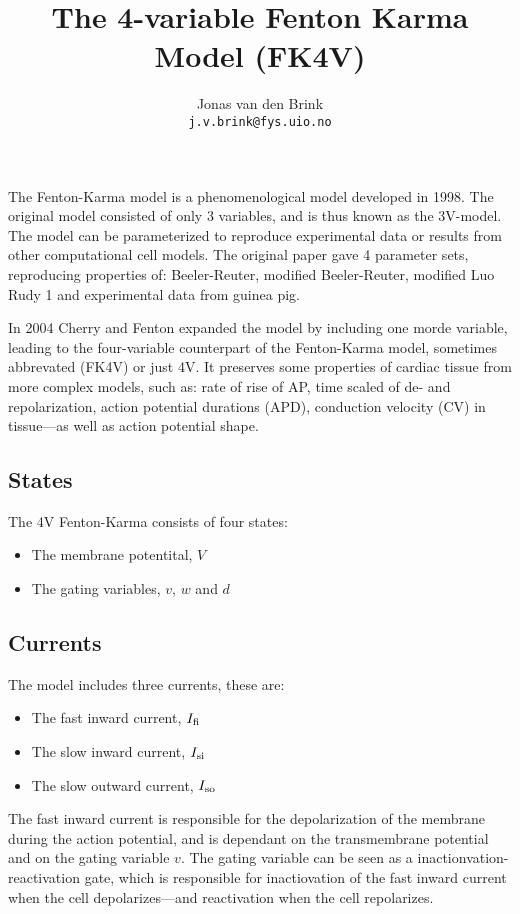 \documentclass[a4paper, 11pt, notitlepage, english]{article}
\title{The 4-variable Fenton Karma Model (FK4V)}
\author{Jonas van den Brink \\ \texttt{j.v.brink@fys.uio.no}}
\begin{document}
\maketitle

The Fenton-Karma model is a phenomenological model developed in 1998. The original model consisted of only 3 variables, and is thus known as the 3V-model. The model can be parameterized to reproduce experimental data or results from other computational cell models. The original paper gave 4 parameter sets, reproducing properties of: Beeler-Reuter, modified Beeler-Reuter, modified Luo Rudy 1 and experimental data from guinea pig.

In 2004 Cherry and Fenton expanded the model by including one morde variable, leading to the four-variable counterpart of the Fenton-Karma model, sometimes abbrevated (FK4V) or just 4V. It preserves some properties of cardiac tissue from more complex models, such as: rate of rise of AP, time scaled of de- and repolarization, action potential durations (APD), conduction velocity (CV) in tissue---as well as action potential shape.

\subsection*{States}
The 4V Fenton-Karma consists of four states:
\begin{itemize}
    \item The membrane potentital, $V$
    \item The gating variables, $v$, $w$ and $d$
\end{itemize}

\subsection*{Currents}
The model includes three currents, these are:
\begin{itemize}
    \item The fast inward current, $I_{\rm fi}$
    \item The slow inward current, $I_{\rm si}$
    \item The slow outward current, $I_{\rm so}$
\end{itemize}

The fast inward current is responsible for the depolarization of the membrane during the action potential, and is dependant on the transmembrane potential and on the gating variable $v$. The gating variable can be seen as a inactionvation-reactivation gate, which is responsible for inactiovation of the fast inward current when the cell depolarizes---and reactivation when the cell repolarizes.
\end{document}
